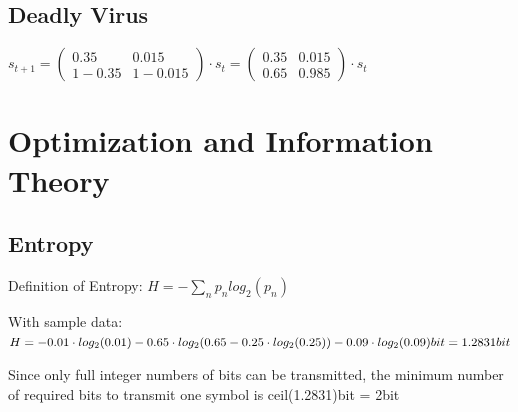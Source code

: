 \documentclass[accentcolor=tud9c]{tudexercise}
\begin{document}
	\subsection{Deadly Virus}
	$ s_{t+1} = \begin{pmatrix}
	 0.35 & 0.015\\
	 1-0.35 & 1-0.015
	\end{pmatrix} \cdot s_t = \begin{pmatrix}
	0.35 & 0.015\\
	0.65 & 0.985
	\end{pmatrix} \cdot s_t $
	
	
	\section{Optimization and Information Theory}
	\subsection{Entropy}
	Definition of Entropy: $ H = -\sum_{n} p_n log_2(p_n)$
	
	With sample data: $ H = -0.01 \cdot log_2(0.01) - 0.65 \cdot log_2(0.65 - 0.25 \cdot log_2(0.25)) - 0.09 \cdot log_2(0.09) bit\\
	 = 1.2831 bit
	$
	
	Since only full integer numbers of bits can be transmitted, the minimum number of required bits to transmit one symbol is ceil(1.2831)bit = 2bit
	
	
\end{document}
